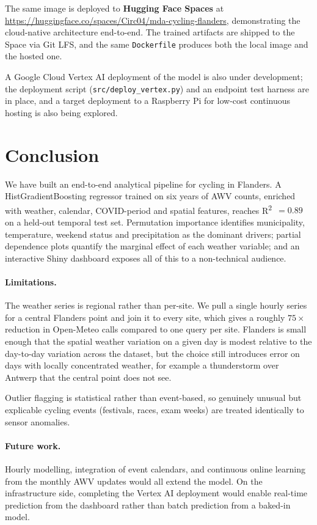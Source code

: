 \documentclass[11pt,a4paper]{article}
\begin{document}
The same image is deployed to \textbf{Hugging Face Spaces} at
\url{https://huggingface.co/spaces/Circ04/mda-cycling-flanders},
demonstrating the cloud-native architecture end-to-end. The trained
artifacts are shipped to the Space via Git LFS, and the same
\texttt{Dockerfile} produces both the local image and the hosted one.

A Google Cloud Vertex AI deployment of the model is also under
development; the deployment script (\texttt{src/deploy\_vertex.py})
and an endpoint test harness are in place, and a target deployment to
a Raspberry Pi for low-cost continuous hosting is also being explored.

\section{Conclusion}
\label{sec:conclusion}

We have built an end-to-end analytical pipeline for cycling in
Flanders. A HistGradientBoosting regressor trained on six years of
AWV counts, enriched with weather, calendar, COVID-period and spatial
features, reaches R\textsuperscript{2}~$=0.89$ on a held-out temporal
test set. Permutation importance identifies municipality, temperature,
weekend status and precipitation as the dominant drivers; partial
dependence plots quantify the marginal effect of each weather
variable; and an interactive Shiny dashboard exposes all of this to a
non-technical audience.

\paragraph{Limitations.}
The weather series is regional rather than per-site. We pull a
single hourly series for a central Flanders point and join it to every
site, which gives a roughly $75\times$ reduction in Open-Meteo calls
compared to one query per site. Flanders is small enough that the
spatial weather variation on a given day is modest relative to the
day-to-day variation across the dataset, but the choice still
introduces error on days with locally concentrated weather, for
example a thunderstorm over Antwerp that the central point does not
see.

Outlier flagging is statistical rather than event-based, so genuinely
unusual but explicable cycling events (festivals, races, exam weeks)
are treated identically to sensor anomalies.

\paragraph{Future work.}
Hourly modelling, integration of event calendars, and continuous
online learning from the monthly AWV updates would all extend the
model. On the infrastructure side, completing the Vertex AI deployment
would enable real-time prediction from the dashboard rather than batch
prediction from a baked-in model.
\end{document}
